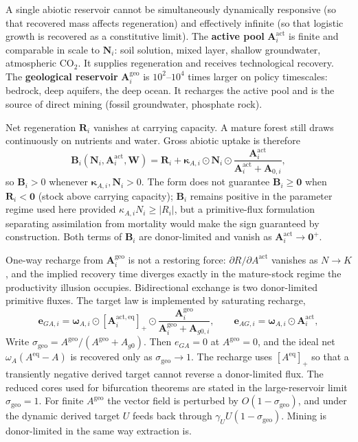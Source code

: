\documentclass[11pt]{article}
\theoremstyle{definition}
\begin{document}
A single abiotic reservoir cannot be simultaneously dynamically responsive (so that recovered mass affects regeneration) and effectively infinite (so that logistic growth is recovered as a constitutive limit). The \textbf{active pool} $\mathbf A^{\mathrm{act}}_i$ is finite and comparable in scale to $\mathbf N_i$: soil solution, mixed layer, shallow groundwater, atmospheric $\mathrm{CO}_2$. It supplies regeneration and receives technological recovery. The \textbf{geological reservoir} $\mathbf A^{\mathrm{geo}}_i$ is $10^2$--$10^4$ times larger on policy timescales: bedrock, deep aquifers, the deep ocean. It recharges the active pool and is the source of direct mining (fossil groundwater, phosphate rock).

Net regeneration $\mathbf R_i$ vanishes at carrying capacity. A mature forest still draws continuously on nutrients and water. Gross abiotic uptake is therefore
\begin{equation}
\mathbf B_i(\mathbf N_i,\mathbf A^{\mathrm{act}}_i,\mathbf W)
= \mathbf R_i + \boldsymbol\kappa_{A,i}\odot\mathbf N_i\odot\frac{\mathbf A^{\mathrm{act}}_i}{\mathbf A^{\mathrm{act}}_i+\mathbf A_{0,i}},
\end{equation}
so $\mathbf B_i>0$ whenever $\boldsymbol\kappa_{A,i},\mathbf N_i>0$. The form does not guarantee $\mathbf B_i\ge\mathbf 0$ when $\mathbf R_i<\mathbf 0$ (stock above carrying capacity); $\mathbf B_i$ remains positive in the parameter regime used here provided $\kappa_{A,i}N_i\ge|R_i|$, but a primitive-flux formulation separating assimilation from mortality would make the sign guaranteed by construction. Both terms of $\mathbf B_i$ are donor-limited and vanish as $\mathbf A^{\mathrm{act}}_i\to\mathbf 0^+$.

One-way recharge from $\mathbf A^{\mathrm{geo}}_i$ is not a restoring force: $\partial R/\partial A^{\mathrm{act}}$ vanishes as $N\to K$, and the implied recovery time diverges exactly in the mature-stock regime the productivity illusion occupies. Bidirectional exchange is two donor-limited primitive fluxes. The target law is implemented by saturating recharge,
\begin{equation}
\mathbf e_{GA,i}
=
\boldsymbol\omega_{A,i}\odot[\mathbf A^{\mathrm{act,eq}}_i]_+
\odot
\frac{\mathbf A^{\mathrm{geo}}_i}{\mathbf A^{\mathrm{geo}}_i+\mathbf A_{g0,i}},
\qquad
\mathbf e_{AG,i}=\boldsymbol\omega_{A,i}\odot\mathbf A^{\mathrm{act}}_i,
\label{eq:exchange-primitive}
\end{equation}
Write $\sigma_{\mathrm{geo}}=A^{\mathrm{geo}}/(A^{\mathrm{geo}}+A_{g0})$. Then $e_{GA}=0$ at $A^{\mathrm{geo}}=0$, and the ideal net $\omega_A(A^{\mathrm{eq}}-A)$ is recovered only as $\sigma_{\mathrm{geo}}\to 1$. The recharge uses $[A^{\mathrm{eq}}]_+$ so that a transiently negative derived target cannot reverse a donor-limited flux. The reduced cores used for bifurcation theorems are stated in the large-reservoir limit $\sigma_{\mathrm{geo}}=1$. For finite $A^{\mathrm{geo}}$ the vector field is perturbed by $O(1-\sigma_{\mathrm{geo}})$, and under the dynamic derived target $U$ feeds back through $\gamma_U U(1-\sigma_{\mathrm{geo}})$. Mining is donor-limited in the same way extraction is.
\end{document}
